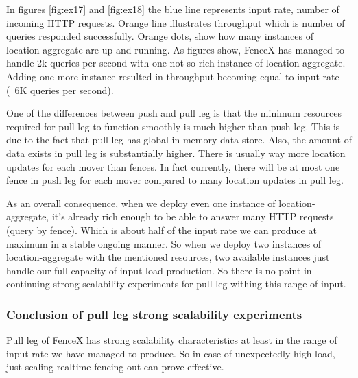 \documentclass[a4]{report}
\begin{document}
    \clearpage

    In figures \ref{fig:ex17} and \ref{fig:ex18} the blue line represents input rate, number of incoming HTTP
    requests.
    Orange line illustrates throughput which is number of queries responded successfully.
    Orange dots, show how many instances of location-aggregate are up and running.
    As figures show, FenceX has managed to handle 2k queries per second with one not so rich instance of location-aggregate.
    Adding one more instance resulted in throughput becoming equal to input rate (~6K queries per second).

    One of the differences between push and pull leg is that the minimum resources required for pull leg to function
    smoothly is much higher than push leg.
    This is due to the fact that pull leg has global in memory data store.
    Also, the amount of data exists in pull leg is substantially higher.
    There is usually way more location updates for each mover than fences.
    In fact currently, there will be at most one fence in push leg for each mover compared to many location updates
    in pull leg.

    As an overall consequence, when we deploy even one instance of location-aggregate, it's already rich enough to be
    able to answer many HTTP requests (query by fence).
    Which is about half of the input rate we can produce at maximum in a stable ongoing manner.
    So when we deploy two instances of location-aggregate with the mentioned resources, two available instances just
    handle our full capacity of input load production.
    So there is no point in continuing strong scalability experiments for pull leg withing this range of input.

    \subsubsection{Conclusion of pull leg strong scalability experiments}
    Pull leg of FenceX has strong scalability characteristics at least in the range of input rate we have managed to
    produce.
    So in case of unexpectedly high load, just scaling realtime-fencing out can prove effective.
\end{document}
